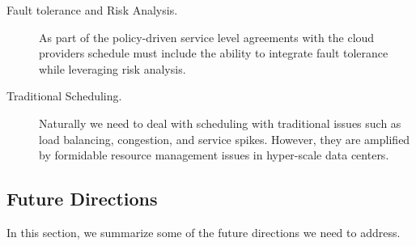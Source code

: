 \documentclass[final,5p,times,twocolumn]{elsarticle}
\begin{document}
\begin{description}
\item[Fault tolerance and Risk Analysis.] As part of the policy-driven service level agreements with the cloud providers schedule must include the ability to integrate fault tolerance while leveraging risk analysis.

\item[Traditional Scheduling.] Naturally we need to deal with scheduling with traditional issues such as load balancing, congestion, and service spikes. However, they are amplified by formidable resource management issues in hyper-scale data centers.



\end{description}

\subsection{Future Directions}

In this section, we summarize some of the future directions we need to address.
\end{document}
